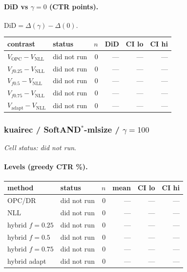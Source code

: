 \documentclass[10pt,a4paper]{article}
\begin{document}
\paragraph{DiD vs $\gamma=0$ (CTR points).} $\mathrm{DiD}=\Delta(\gamma)-\Delta(0)$.
{\centering\small\begin{tabular}{llrrrr}
\toprule contrast & status & $n$ & DiD & CI lo & CI hi \\
\midrule
$V_{\mathrm{OPC}}-V_{\mathrm{NLL}}$ & did not run & 0 & --- & --- & --- \\
$V_{f0.25}-V_{\mathrm{NLL}}$ & did not run & 0 & --- & --- & --- \\
$V_{f0.5}-V_{\mathrm{NLL}}$ & did not run & 0 & --- & --- & --- \\
$V_{f0.75}-V_{\mathrm{NLL}}$ & did not run & 0 & --- & --- & --- \\
$V_{\mathrm{adapt}}-V_{\mathrm{NLL}}$ & did not run & 0 & --- & --- & --- \\
\bottomrule\end{tabular}\par}
\bigskip
\subsubsection{kuairec / SoftAND$^*$-mlsize / $\gamma=100$}
\emph{Cell status: did not run}.
\paragraph{Levels (greedy CTR \%).}
{\centering\small\begin{tabular}{llrrrr}
\toprule method & status & $n$ & mean & CI lo & CI hi \\
\midrule
OPC/DR & did not run & 0 & --- & --- & --- \\
NLL & did not run & 0 & --- & --- & --- \\
hybrid $f{=}0.25$ & did not run & 0 & --- & --- & --- \\
hybrid $f{=}0.5$ & did not run & 0 & --- & --- & --- \\
hybrid $f{=}0.75$ & did not run & 0 & --- & --- & --- \\
hybrid adapt & did not run & 0 & --- & --- & --- \\
\bottomrule\end{tabular}\par}
\end{document}

